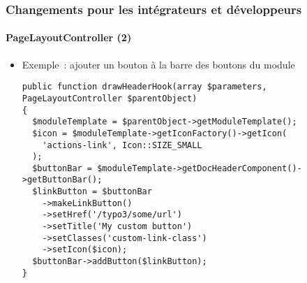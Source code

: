 %

\begin{frame}[fragile]
	\frametitle{Changements pour les intégrateurs et développeurs}
	\framesubtitle{PageLayoutController (2)}


	\begin{itemize}
		\item Exemple~: ajouter un bouton à la barre des boutons du module
\begin{lstlisting}
public function drawHeaderHook(array $parameters, PageLayoutController $parentObject)
{
  $moduleTemplate = $parentObject->getModuleTemplate();
  $icon = $moduleTemplate->getIconFactory()->getIcon(
    'actions-link', Icon::SIZE_SMALL
  );
  $buttonBar = $moduleTemplate->getDocHeaderComponent()->getButtonBar();
  $linkButton = $buttonBar
    ->makeLinkButton()
    ->setHref('/typo3/some/url')
    ->setTitle('My custom button')
    ->setClasses('custom-link-class')
    ->setIcon($icon);
  $buttonBar->addButton($linkButton);
}
\end{lstlisting}

	\end{itemize}

\end{frame}

